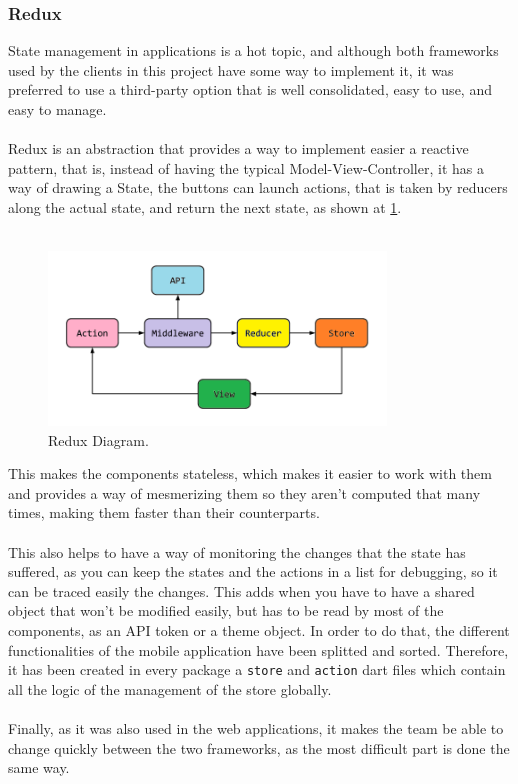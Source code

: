 \documentclass[./main.tex]{subfiles}
\begin{document}
	\subsubsection{Redux}
	State management in applications is a hot topic, and although both frameworks used by the clients in this project have some way to implement it, it was preferred to use a third-party option that is well consolidated, easy to use, and easy to manage.\\
	\\
	Redux is an abstraction that provides a way to implement easier a reactive pattern, that is, instead of having the typical Model-View-Controller, it has a way of drawing a State, the buttons can launch actions, that is taken by reducers along the actual state, and return the
	next state, as shown at \ref{fig:redux}.\\
	\\
	\begin{figure}[H]
		\centering
		\includegraphics[width=0.8\textwidth]{img/redux.png}
		\caption{Redux Diagram.}
		\label{fig:redux}
	\end{figure}
	This makes the components stateless, which makes it easier to work with them and provides a way of mesmerizing them so they aren't computed that many times, making them faster than their counterparts. 
	\\
	\\
	This also helps to have a way of monitoring the changes that the state has suffered, as you can keep the states and the actions in a list for debugging, so it can be traced easily the changes. This adds when you have to have a shared object that won't be modified easily, but has to be read by most of the components, as an API token or a theme object. In order to do that, the different functionalities of the mobile application have been splitted and sorted. Therefore, it has been created in every package a \texttt{store} and \texttt{action} dart files which contain all the logic of the management of the store globally.
	\\
	\\
	Finally, as it was also used in the web applications, it makes the team be able to change quickly between the two frameworks, as the most difficult part is done the same way.
	\\

	
\end{document}
